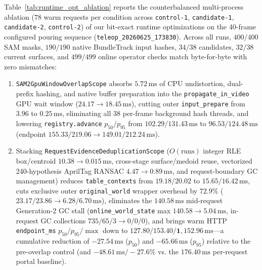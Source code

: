 \documentclass[10pt,journal]{IEEEtran}
\begin{document}
Table~\ref{tab:runtime_opt_ablation} reports the counterbalanced multi-process ablation ($78$ warm requests per condition across \texttt{control-1}, \texttt{candidate-1}, \texttt{candidate-2}, \texttt{control-2}) of our bit-exact runtime optimizations on the 40-frame configured pouring sequence (\texttt{teleop\_20260625\_173830}). Across all runs, $400/400$ SAM masks, $190/190$ native BundleTrack input hashes, $34/38$ candidates, $32/38$ current surfaces, and $499/499$ online operator checks match byte-for-byte with zero mismatches:
\begin{enumerate}
    \item \texttt{SAM2GpuWindowOverlapScope} absorbs $5.72\,\mathrm{ms}$ of CPU undistortion, dual-prefix hashing, and native buffer preparation into the \texttt{propagate\_in\_video} GPU wait window ($24.17\to 18.45\,\mathrm{ms}$), cutting outer \texttt{input\_prepare} from $3.96$ to $0.25\,\mathrm{ms}$, eliminating all $38$ per-frame background hash threads, and lowering \texttt{registry.advance} $p_{50}/p_{95}$ from $102.29/131.43\,\mathrm{ms}$ to $96.53/124.48\,\mathrm{ms}$ (endpoint $155.33/219.06\to 149.01/212.24\,\mathrm{ms}$).
    \item Stacking \texttt{RequestEvidenceDeduplicationScope} ($O(\text{runs})$ integer RLE box/centroid $10.38\to 0.015\,\mathrm{ms}$, cross-stage surface/medoid reuse, vectorized 240-hypothesis AprilTag RANSAC $4.47\to 0.89\,\mathrm{ms}$, and request-boundary GC management) reduces \texttt{table\_contexts} from $19.18/20.02$ to $15.65/16.42\,\mathrm{ms}$, cuts exclusive outer \texttt{original\_world} wrapper overhead by $\mathbf{72.9\%}$ ($23.17/23.86\to 6.28/6.70\,\mathrm{ms}$), eliminates the $140.58\,\mathrm{ms}$ mid-request Generation-2 GC stall (\texttt{online\_world\_state} max $140.58\to 5.04\,\mathrm{ms}$, in-request GC collections $735/65/3\to 0/0/0$), and brings warm HTTP \texttt{endpoint\_ms} $p_{50}/p_{95}/\max$ down to $\mathbf{127.80/153.40/1{,}152.96\,\mathrm{ms}}$---a cumulative reduction of $\mathbf{-27.54\,\mathrm{ms}}$ ($p_{50}$) and $\mathbf{-65.66\,\mathrm{ms}}$ ($p_{95}$) relative to the pre-overlap control (and $-48.61\,\mathrm{ms}/-27.6\%$ vs. the $176.40\,\mathrm{ms}$ per-request portal baseline).
\end{enumerate}
\end{document}
